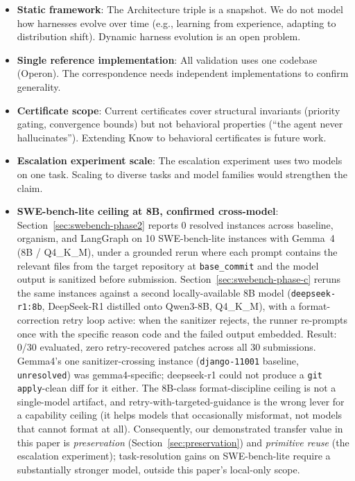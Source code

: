 \begin{itemize}[leftmargin=*]
\item \textbf{Static framework}: The Architecture triple is a snapshot. We do not model how harnesses evolve over time (e.g., learning from experience, adapting to distribution shift). Dynamic harness evolution is an open problem.
\item \textbf{Single reference implementation}: All validation uses one codebase (Operon). The correspondence needs independent implementations to confirm generality.
\item \textbf{Certificate scope}: Current certificates cover structural invariants (priority gating, convergence bounds) but not behavioral properties (``the agent never hallucinates''). Extending $\mathrm{Know}$ to behavioral certificates is future work.
\item \textbf{Escalation experiment scale}: The escalation experiment uses two models on one task. Scaling to diverse tasks and model families would strengthen the claim.
\item \textbf{SWE-bench-lite ceiling at 8B, confirmed cross-model}: Section~\ref{sec:swebench-phase2} reports 0 resolved instances across baseline, organism, and LangGraph on 10 SWE-bench-lite instances with Gemma~4 (8B / Q4\_K\_M), under a grounded rerun where each prompt contains the relevant files from the target repository at \texttt{base\_commit} and the model output is sanitized before submission. Section~\ref{sec:swebench-phase-c} reruns the same instances against a second locally-available 8B model (\texttt{deepseek-r1:8b}, DeepSeek-R1 distilled onto Qwen3-8B, Q4\_K\_M), with a format-correction retry loop active: when the sanitizer rejects, the runner re-prompts once with the specific reason code and the failed output embedded. Result: 0/30 evaluated, zero retry-recovered patches across all 30 submissions. Gemma4's one sanitizer-crossing instance (\texttt{django-11001} baseline, \texttt{unresolved}) was gemma4-specific; deepseek-r1 could not produce a \texttt{git apply}-clean diff for it either. The 8B-class format-discipline ceiling is not a single-model artifact, and retry-with-targeted-guidance is the wrong lever for a capability ceiling (it helps models that occasionally misformat, not models that cannot format at all). Consequently, our demonstrated transfer value in this paper is \emph{preservation} (Section~\ref{sec:preservation}) and \emph{primitive reuse} (the escalation experiment); task-resolution gains on SWE-bench-lite require a substantially stronger model, outside this paper's local-only scope.
\end{itemize}

